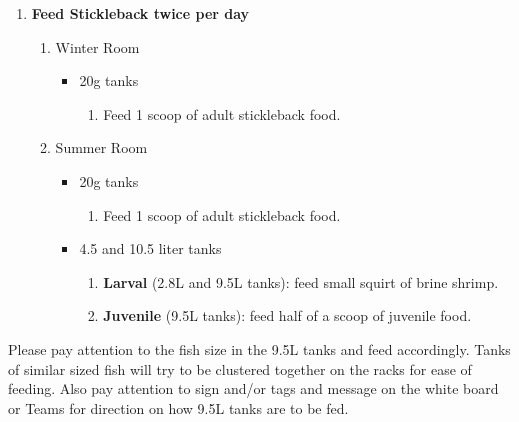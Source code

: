 \documentclass[
  letterpaper,
  DIV=11,
  numbers=noendperiod]{scrreprt}
\providecommand{\tightlist}{%
  \setlength{\itemsep}{0pt}\setlength{\parskip}{0pt}}\usepackage{longtable,booktabs,array}
\begin{document}
\begin{enumerate}
\def\labelenumi{\arabic{enumi}.}
\setcounter{enumi}{2}
\item
  \textbf{Feed Stickleback twice per day}

  \begin{enumerate}
  \def\labelenumii{\arabic{enumii}.}
  \tightlist
  \item
    Winter Room

    \begin{itemize}
    \tightlist
    \item
      20g tanks

      \begin{enumerate}
      \def\labelenumiii{\arabic{enumiii}.}
      \tightlist
      \item
        Feed 1 scoop of adult stickleback food.
      \end{enumerate}
    \end{itemize}
  \item
    Summer Room

    \begin{itemize}
    \tightlist
    \item
      20g tanks

      \begin{enumerate}
      \def\labelenumiii{\arabic{enumiii}.}
      \tightlist
      \item
        Feed 1 scoop of adult stickleback food.
      \end{enumerate}
    \item
      4.5 and 10.5 liter tanks

      \begin{enumerate}
      \def\labelenumiii{\arabic{enumiii}.}
      \tightlist
      \item
        \textbf{Larval} (2.8L and 9.5L tanks): feed small squirt of
        brine shrimp.
      \item
        \textbf{Juvenile} (9.5L tanks): feed half of a scoop of juvenile
        food.
      \end{enumerate}
    \end{itemize}
  \end{enumerate}
\end{enumerate}

\begin{tcolorbox}[enhanced jigsaw, rightrule=.15mm, title=\textcolor{quarto-callout-warning-color}{\faExclamationTriangle}\hspace{0.5em}{NOTES}, titlerule=0mm, opacitybacktitle=0.6, toprule=.15mm, bottomrule=.15mm, opacityback=0, left=2mm, colframe=quarto-callout-warning-color-frame, breakable, coltitle=black, colback=white, colbacktitle=quarto-callout-warning-color!10!white, bottomtitle=1mm, leftrule=.75mm, toptitle=1mm, arc=.35mm]

Please pay attention to the fish size in the 9.5L tanks and feed
accordingly. Tanks of similar sized fish will try to be clustered
together on the racks for ease of feeding. Also pay attention to sign
and/or tags and message on the white board or Teams for direction on how
9.5L tanks are to be fed.

\end{tcolorbox}
\end{document}
